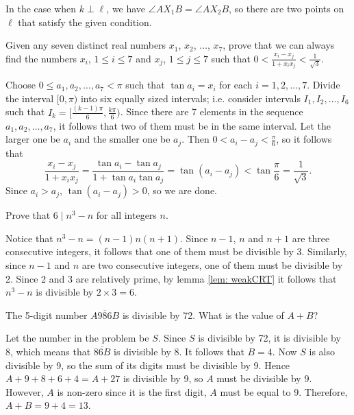 \begin{remark}
    In the case when $k \perp \ell$, we have $\angle AX_1B = \angle AX_2B$, so
    there are two points on $\ell$ that satisfy the given condition.
\end{remark}

\begin{question}
    Given any seven distinct real numbers $x_{1}$, $x_{2}$, $\ldots$, $x_{7}$,
    prove that we can always find the numbers $x_{i}$, $1 \leq i\leq 7$ and
    $x_{j}$, $1 \leq j\leq 7$ such that $0 < \frac{x_{i} - x_{j}}{1 +
    x_{i}x_{j}} < \frac{1}{\sqrt{3}}$.
\end{question}
\begin{solution}
    Choose $0 \leq a_1, a_2, \ldots, a_7 < \pi$ such that $\tan a_i = x_i$ for
    each $i = 1, 2, \ldots, 7$. Divide the interval $[0, \pi)$ into six equally
    sized intervals; i.e. consider intervals $I_1, I_2, \ldots, I_6$ such that
    $I_k = [\frac{(k - 1) \pi}{6}, \frac{k \pi}{6} )$. Since there are 7
    elements in the sequence $a_1, a_2, \ldots, a_7$, it follows that two of
    them must be in the same interval. Let the larger one be $a_i$ and the
    smaller one be $a_j$. Then $0 < a_i - a_j < \frac{\pi}{6}$, so it follows
    that
    \[ \frac{x_i - x_j}{1 + x_i x_j} = \frac{\tan a_i - \tan a_j}{1 + \tan a_i
    \tan a_j} = \tan(a_i - a_j) < \tan \frac{\pi}{6} = \frac{1}{\sqrt{3}}.\] 
    Since $a_i > a_j$, $\tan(a_i - a_j) > 0$, so we are done.     
\end{solution}

\begin{question}
    Prove that $6 \mid n^3 - n$ for all integers $n$.
\end{question}
\begin{solution}
    Notice that $n^3 - n = (n - 1)n(n + 1)$. Since $n - 1$, $n$ and $n + 1$ are
    three consecutive integers, it follows that one of them must be divisible
    by 3. Similarly, since $n - 1$ and $n$ are two consecutive integers, one of
    them must be divisible by 2. Since 2 and 3 are relatively prime, by lemma
    \ref{lem: weakCRT} it follows that $n^3 - n$ is divisible by $2 \times 3 =
    6$.
\end{solution}

\begin{question}
    The 5-digit number $\overline{A986B}$ is divisible by 72. What is the value of $A + B$?
\end{question}
\begin{solution}
    Let the number in the problem be $S$. Since $S$ is divisible by 72, it is
    divisible by 8, which means that $\overline{86B}$ is divisible by 8. It
    follows that $B = 4$. Now $S$ is also divisible by 9, so the sum of its
    digits must be divisible by 9. Hence $A + 9 + 8 + 6 + 4 = A + 27$ is
    divisible by 9, so $A$ must be divisible by 9. However, $A$ is non-zero
    since it is the first digit, $A$ must be equal to 9. Therefore, $A + B = 9
    + 4 = 13$.
\end{solution}

